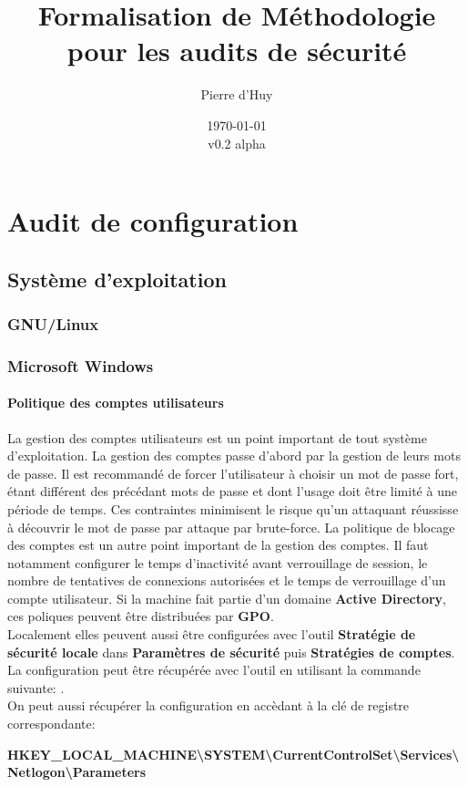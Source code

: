 \documentclass[twoside,a4paper,12pt,titlepage]{book}
\title{Formalisation de Méthodologie pour les audits de sécurité}
\author{Pierre d'Huy}
\date{\today\\v0.2 alpha}
\begin{document}
\chapter{Audit de configuration}

\section{Système d'exploitation}
\subsection{GNU/Linux}
\subsection{Microsoft Windows}

\subsubsection{Politique des comptes utilisateurs}
La gestion des comptes utilisateurs est un point important de tout système d'exploitation. La gestion des comptes passe d'abord par la gestion de leurs mots de passe. Il est recommandé de forcer l'utilisateur à choisir un mot de passe fort, étant différent des précédant mots de passe et dont l'usage doit être limité à une période de temps. Ces contraintes minimisent le risque qu'un attaquant  réussisse à découvrir le mot de passe par attaque par brute-force. La politique de blocage des comptes est un autre point important de la gestion des comptes. Il faut notamment configurer le temps d'inactivité avant verrouillage de session,  le nombre de tentatives de connexions autorisées et le temps de verrouillage d'un compte utilisateur. Si la machine fait partie d'un domaine \textbf{Active Directory}, ces poliques peuvent être distribuées par \textbf{GPO}.\\
Localement elles peuvent aussi être configurées avec l'outil \textbf{Stratégie de sécurité locale} dans \textbf{Paramètres de sécurité} puis \textbf{Stratégies de comptes}.\\
La configuration peut être récupérée avec l'outil  en utilisant la commande suivante: .\\
On peut aussi récupérer la configuration en accèdant à la clé de registre correspondante:\\
\begin{center}\bfseries \footnotesize HKEY\_LOCAL\_MACHINE\textbackslash SYSTEM\textbackslash CurrentControlSet\textbackslash Services\textbackslash Netlogon\textbackslash Parameters\end{center}%
\end{document}
